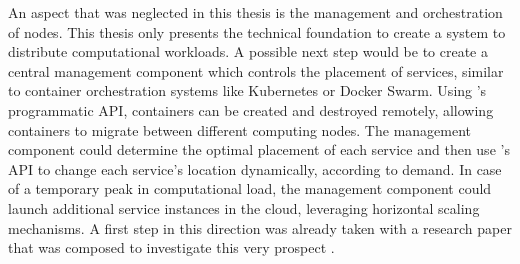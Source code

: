 An aspect that was neglected in this thesis is the management and orchestration of nodes. This thesis only presents the technical foundation to create a system to distribute computational workloads. A possible next step would be to create a central management component which controls the placement of services, similar to container orchestration systems like Kubernetes or Docker Swarm. Using \docker 's programmatic API, containers can be created and destroyed remotely, allowing containers to migrate between different computing nodes. The management component could determine the optimal placement of each service and then use \docker 's API to change each service's location dynamically, according to demand. In case of a temporary peak in computational load, the management component could launch additional service instances in the cloud, leveraging horizontal scaling mechanisms. A first step in this direction was already taken with a research paper that was composed to investigate this very prospect \cite{kugele:hettler:itsc}.
